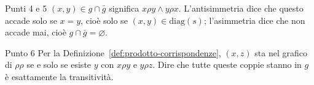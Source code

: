 \begin{concetto}
\begin{dimostrazione}
    \begin{caso}{Punti 4 e 5}
        $(x, y) \in g \cap \bar{g}$ significa $x \rho y \wedge y \rho x$. L'antisimmetria dice che questo accade solo se $x = y$, cioè solo
        se $(x, y) \in \mathrm{diag}(s)$; l'asimmetria dice che non accade mai, cioè $g \cap \bar{g} = \varnothing$.
    \end{caso}
    \begin{caso}{Punto 6}
        Per la Definizione~\ref{def:prodotto-corrispondenze}, $(x, z)$ sta nel grafico di $\rho\rho$ se e solo se esiste $y$ con
        $x \rho y$ e $y \rho z$. Dire che tutte queste coppie stanno in $g$ è esattamente la transitività.
    \end{caso}
\end{dimostrazione}
\end{concetto}


